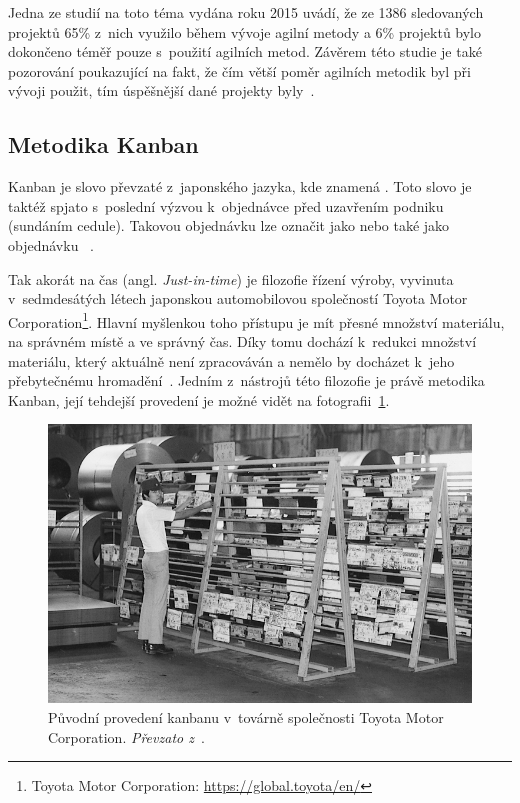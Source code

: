 Jedna ze studií na toto téma vydána roku 2015 uvádí, že ze 1386 sledovaných projektů 65\% z~nich využilo během vývoje agilní metody a 6\% projektů bylo dokončeno téměř pouze s~použití agilních metod. Závěrem této studie je také pozorování poukazující na fakt, že čím větší poměr agilních metodik byl při vývoji použit, tím úspěšnější dané projekty byly~\cite{bib:agile-work}.

\subsection{Metodika Kanban}
Kanban je slovo převzaté z~japonského jazyka, kde znamená . Toto slovo je taktéž spjato s~poslední výzvou k~objednávce před uzavřením podniku (sundáním cedule). Takovou objednávku lze označit jako  nebo také jako objednávku ~\cite{bib:dict-kanban}. 

Tak akorát na čas (angl. \emph{Just-in-time}) je filozofie řízení výroby, vyvinuta v~sedmdesátých létech japonskou automobilovou společností Toyota Motor Corporation\footnote{Toyota Motor Corporation: \url{https://global.toyota/en/}}. Hlavní myšlenkou toho přístupu je mít přesné množství materiálu, na správném místě a ve správný čas. Díky tomu dochází k~redukci množství materiálu, který aktuálně není zpracováván a nemělo by docházet k~jeho přebytečnému hromadění~\cite{bib:just-in-time}. Jedním z~nástrojů této filozofie je právě metodika Kanban, její tehdejší provedení je možné vidět na fotografii~\ref{img:kanban-toyota}.

\begin{figure}[H]
	\centering
	\includegraphics[width=\textwidth]{obrazky-figures/toyota-kanban.jpg}
	\caption{Původní provedení kanbanu v~továrně společnosti Toyota Motor Corporation. \emph{Převzato z~\cite{bib:toyota-history}}.}
	\label{img:kanban-toyota}
\end{figure}

